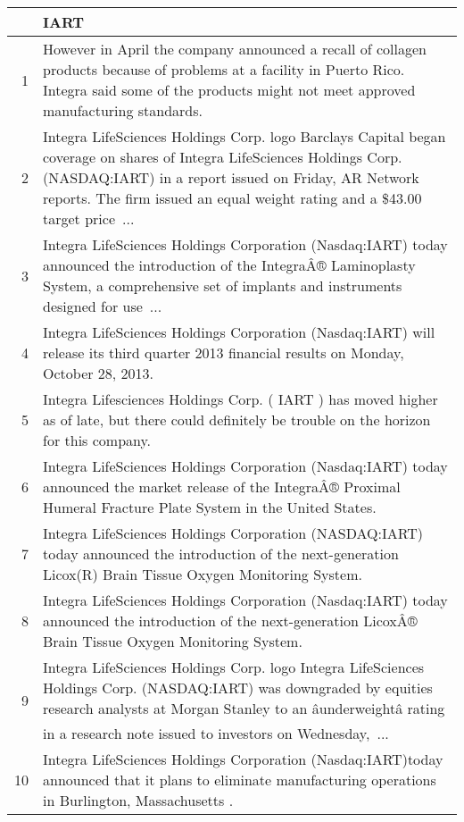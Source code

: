 \documentclass{tufte-handout}\usepackage[]{graphicx}\usepackage[]{color}
\begin{document}
\begin{tabularx}{\textwidth}{rX}
  \hline
 & IART \\ 
  \hline
1 &  However in April the company announced a recall of collagen products because of problems at a facility in Puerto Rico. Integra said some of the products might not meet approved manufacturing standards.  \\ 
  2 &  Integra LifeSciences Holdings Corp. logo Barclays Capital began coverage on shares of Integra LifeSciences Holdings Corp. (NASDAQ:IART) in a report issued on Friday, AR Network reports. The firm issued an equal weight rating and a \$43.00 target price ...  \\ 
  3 &  Integra LifeSciences Holdings Corporation (Nasdaq:IART) today announced the introduction of the IntegraÂ® Laminoplasty System, a comprehensive set of implants and instruments designed for use ...  \\ 
  4 &  Integra LifeSciences Holdings Corporation (Nasdaq:IART) will release its third quarter 2013 financial results on Monday, October 28, 2013.  \\ 
  5 &  Integra Lifesciences Holdings Corp. ( IART ) has moved higher as of late, but there could definitely be trouble on the horizon for this company.  \\ 
  6 &  Integra LifeSciences Holdings Corporation (Nasdaq:IART) today announced the market release of the IntegraÂ® Proximal Humeral Fracture Plate System in the United States.  \\ 
  7 &  Integra LifeSciences Holdings Corporation (NASDAQ:IART) today announced the introduction of the next-generation Licox(R) Brain Tissue Oxygen Monitoring System.  \\ 
  8 &  Integra LifeSciences Holdings Corporation (Nasdaq:IART) today announced the introduction of the next-generation LicoxÂ® Brain Tissue Oxygen Monitoring System.  \\ 
  9 &  Integra LifeSciences Holdings Corp. logo Integra LifeSciences Holdings Corp. (NASDAQ:IART) was downgraded by equities research analysts at Morgan Stanley to an âunderweightâ rating in a research note issued to investors on Wednesday, ...  \\ 
  10 &  Integra LifeSciences Holdings Corporation (Nasdaq:IART)today announced that it plans to eliminate manufacturing operations in Burlington, Massachusetts .  \\ 
   \hline
\end{tabularx}
\end{document}
